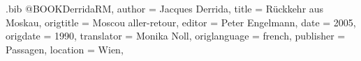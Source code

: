 \RequirePackage{filecontents}
\begin{filecontents*}{\jobname.bib}
@BOOK{DerridaRM,
  author = {Jacques Derrida},
  title = {Rückkehr aus Moskau},
  origtitle = {Moscou aller-retour},
  editor = {Peter Engelmann},
  date = {2005},
  origdate = {1990},
  translator = {Monika Noll},
  origlanguage = {french},
  publisher = {Passagen},
  location = {Wien},
}
\end{filecontents*}
\documentclass[a4paper]{scrartcl}
\usepackage[T1]{fontenc}
\usepackage[utf8]{inputenc}

\usepackage[backend=biber]{biblatex}





\section{Einleitung}
Ich zitiere einen Test.\autocite{DerridaRM}   

\printbibliography 
